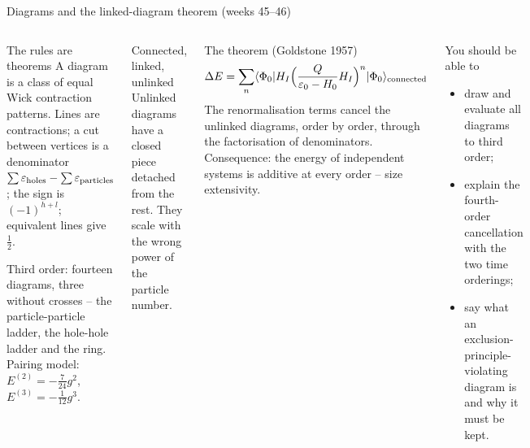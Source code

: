 \documentclass[aspectratio=169,10pt]{beamer}
\newcommand{\mel}[3]{\langle #1\lvert #2\rvert #3\rangle}
\newcommand{\ph}{\Phi_0}
\begin{document}
\begin{frame}[shrink=7]{Diagrams and the linked-diagram theorem (weeks 45--46)}
\small
\begin{columns}[T]
\begin{block}{The rules are theorems}
A diagram is a class of equal Wick contraction patterns. Lines are contractions; a cut between vertices is a denominator $\sum\varepsilon_{\rm holes}-\sum\varepsilon_{\rm particles}$; the sign is $(-1)^{h+l}$; equivalent lines give $\tfrac12$.

Third order: fourteen diagrams, three without crosses -- the particle-particle ladder, the hole-hole ladder and the ring. Pairing model: $E^{(2)}=-\tfrac7{24}g^2$, $E^{(3)}=-\tfrac1{12}g^3$.
\end{block}
\begin{block}{Connected, linked, unlinked}
Unlinked diagrams have a closed piece detached from the rest. They scale with the wrong power of the particle number.
\end{block}
\begin{block}{The theorem (Goldstone 1957)}
\[
 \Delta E=\sum_{n}\mel{\ph}{H_I\Bigl(\frac{Q}{\varepsilon_0-H_0}H_I\Bigr)^{n}}{\ph}_{\rm connected}
\]
The renormalisation terms cancel the unlinked diagrams, order by order, through the factorisation of denominators. Consequence: the energy of independent systems is additive at every order -- size extensivity.
\end{block}
\begin{block}{You should be able to}
\begin{itemize}
\item draw and evaluate all diagrams to third order;
\item explain the fourth-order cancellation with the two time orderings;
\item say what an exclusion-principle-violating diagram is and why it must be kept.
\end{itemize}
\end{block}
\end{columns}
\end{frame}
\end{document}
